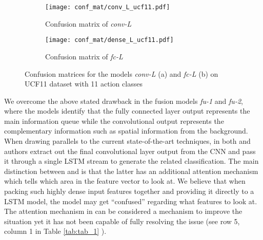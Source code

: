 \documentclass[10pt,twocolumn,letterpaper]{article}
\begin{document}
  
  
  \begin{figure}[t!]
    \centering
     \begin{subfigure}{.9\columnwidth}
      	  \texttt{[image: conf\_mat/conv\_L\_ucf11.pdf]} %
       	 \caption{Confusion matrix of \textit{conv-L}}
    \end{subfigure}
    \begin{subfigure}{.9\columnwidth}
        \texttt{[image: conf\_mat/dense\_L\_ucf11.pdf]}
        \caption{Confusion matrix of \textit{fc-L}}
     \end{subfigure}
     \vspace{-2 mm}
     \caption{Confusion matrices for the models \textit{conv-L} (a) and \textit{fc-L} (b) on UCF11 dataset with 11 action classes } 
     \label{fig:conf_mat_fortwo}
     \vspace{-5 mm}
    \end{figure}


We overcome the above stated drawback in the fusion models \textit{fu-1} and \textit{fu-2}, where the  models identify that the fully connected layer output represents the main information queue while the convolutional output represents the complementary information such as spatial information from the background. %
When drawing parallels to the current state-of-the-art techniques, in both \cite{Baccouche2011} and \cite{Sharma2015} authors extract out the final convolutional layer output from the CNN and pass it through a single LSTM stream to generate the related classification. The main distinction between \cite{Baccouche2011} and \cite{Sharma2015} is that the latter has an additional attention mechanism which tells which area in the feature vector to look at. We believe that when packing such highly dense input features together and providing it directly to a LSTM model, the model may get ``confused'' regarding what features to look at. The attention mechanism in \cite{Sharma2015} can be considered a mechanism to improve the situation yet it has not been capable of fully resolving the issue (see row 5, column 1 in Table \ref{tab:tab_1} ). \par
\end{document}
